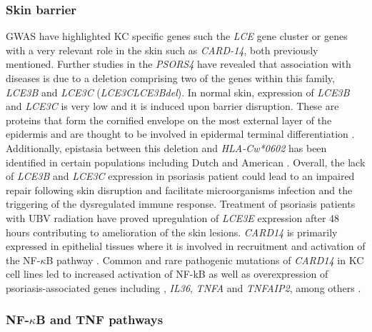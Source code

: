 
\subsubsection*{Skin barrier}
GWAS have highlighted KC specific genes such the \textit{LCE} gene cluster or genes with a very relevant role in the skin such as \textit{CARD-14}, both previously mentioned. Further studies in the \textit{PSORS4} have revealed that association with diseases is due to a deletion comprising two of the genes within this family, \textit{LCE3B} and \textit{LCE3C} (\textit{LCE3C\textunderscore LCE3B\textunderscore del})\parencite{Cid2009}. In normal skin, expression of \textit{LCE3B} and \textit{LCE3C} is very low and it is induced upon barrier disruption. These are proteins that form the cornified envelope on the most external layer of the epidermis and are thought to be involved in epidermal terminal differentiation \parencite{Bergboer2011}. Additionally, epistasia between this deletion and \textit{HLA-Cw*0602} has been identified in certain populations including Dutch and American \parencite{Cid2009, Riveira-Munoz2011}. Overall, the lack of \textit{LCE3B} and \textit{LCE3C} expression in psoriasis patient could lead to an impaired repair following skin disruption and facilitate microorganisms infection and the triggering of the dysregulated immune response. Treatment of psoriasis patients with UBV radiation have proved upregulation of \textit{LCE3E} expression after 48 hours contributing to amelioration of the skin lesions\parencite{Jackson2005}. \textit{CARD14} is primarily expressed in epithelial tissues where it is involved in recruitment and activation of the NF-$\kappa$B pathway \parencite{Blonska2011}. Common and rare pathogenic mutations of \textit{CARD14} in KC cell lines led to increased activation of NF-kB as well as overexpression of psoriasis-associated genes including , \textit{IL36}, \textit{TNFA} and \textit{TNFAIP2}, among others \parencite{Jordan2012b}.


\subsubsection*{NF-$\kappa$B and TNF pathways}

